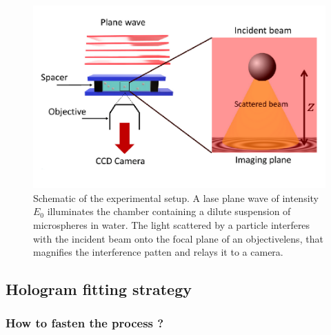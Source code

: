 \begin{figure}[h!]
	\centering
	\includegraphics[scale=0.9]{02_body/chapter2/images/figures_setup/schema_setup.pdf}
	\caption{Schematic of the experimental setup. A lase plane wave of intensity $E_0$ illuminates the chamber containing a dilute suspension of microspheres in water. The light scattered by a particle interferes with the incident beam onto the focal plane of an objectivelens, that magnifies the interference patten and relays it to a camera.}
\end{figure}


\subsection{Hologram fitting strategy}

\subsubsection{How to fasten the process ?}

